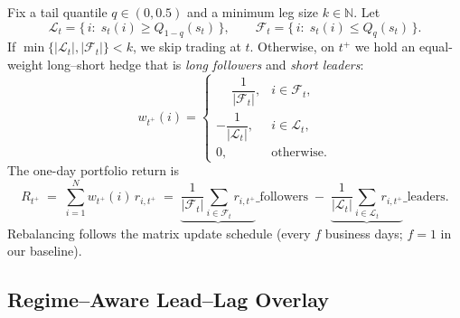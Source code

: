 Fix a tail quantile $q\in(0,0.5)$ and a minimum leg size $k\in\mathbb{N}$.
Let
\[
\mathcal{L}_t=\{\,i:\; s_t(i)\ge Q_{1-q}(s_t)\,\},\qquad
\mathcal{F}_t=\{\,i:\; s_t(i)\le Q_{q}(s_t)\,\}.
\]
If $\min\{|\mathcal{L}_t|,|\mathcal{F}_t|\}<k$, we skip trading at $t$.
Otherwise, on $t^+$ we hold an equal-weight long--short hedge that is \emph{long followers} and \emph{short leaders}:
\[
w_{t^+}(i)=
\begin{cases}
\phantom{-}\dfrac{1}{|\mathcal{F}_t|}, & i\in\mathcal{F}_t,\\[6pt]
-\dfrac{1}{|\mathcal{L}_t|}, & i\in\mathcal{L}_t,\\[6pt]
0, & \text{otherwise}.
\end{cases}
\]
The one-day portfolio return is
\[
R_{t^+}\;=\;\sum_{i=1}^N w_{t^+}(i)\,r_{i,t^+}
\;=\;\underbrace{\frac{1}{|\mathcal{F}_t|}\sum_{i\in\mathcal{F}_t} r_{i,t^+}}\_{\text{followers}}
\;-\;\underbrace{\frac{1}{|\mathcal{L}_t|}\sum_{i\in\mathcal{L}_t} r_{i,t^+}}\_{\text{leaders}}.
\]
Rebalancing follows the matrix update schedule (every $f$ business days; $f=1$ in our baseline).

\subsection{Regime–Aware Lead--Lag Overlay}\label{sec:regime}

